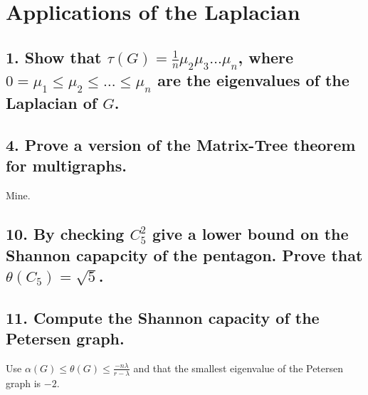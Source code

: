 \section{Applications of the Laplacian}

\subsection[Applications - 1]{1. Show that $\tau(G) = \frac{1}{n} \mu_2 \mu_3 \dots \mu_n$, where $0 = \mu_1 \leq \mu_2 \leq \dots \leq \mu_n$ are the eigenvalues of the Laplacian of $G$.}

\subsection[Applications - 4]{4. Prove a version of the Matrix-Tree theorem for multigraphs.}

Mine.

\subsection[Applications - 10]{10. By checking $C_5^2$ give a lower bound on the Shannon capapcity of the pentagon. Prove that $\theta(C_5) = \sqrt{5}$.}

\subsection[Applications - 11]{11. Compute the Shannon capacity of the Petersen graph.}

Use $\alpha(G) \leq \theta(G) \leq \frac{-n \lambda}{r - \lambda}$ and that the smallest eigenvalue of the Petersen graph is $-2$.
